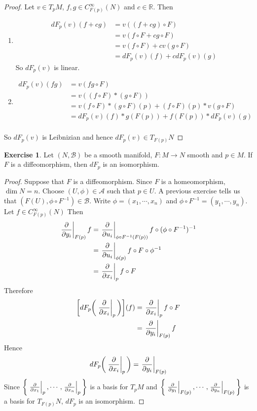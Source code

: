 \documentclass[12pt]{amsart}
\theoremstyle{definition}
\theoremstyle{definition}
\newtheorem{ex}[definition]{Exercise}
\newcommand{\R}{\mathbb{R}}
\newcommand{\MA}{\mathcal{A}}
\newcommand{\MB}{\mathcal{B}}
\begin{document}
	\begin{proof}
	Let $v \in T_pM$, $f,g \in C_{F(p)}^{\infty}(N)$ and $c \in \R$. Then 
	\begin{enumerate}
	\item 
	\begin{align*}
		dF_p(v)(f+cg) 
		&= v((f+cg) \circ F) \\
		&= v(f \circ F + c g \circ F) \\
		&= v(f \circ F) + cv(g \circ F) \\
		&= dF_p(v)(f) + c dF_p(v)(g)
	\end{align*}
	So $dF_p(v)$ is linear.
	\item 
	\begin{align*}
	dF_p(v)(fg) 
	&= v (fg \circ F) \\
	&= v((f \circ F)* (g \circ F)) \\
	&= v(f \circ F)*(g \circ F)(p) +  (f \circ F)(p)* v(g \circ F) \\
	&= dF_p(v)(f) * g(F(p)) + f(F(p))*dF_p(v)(g) \\
	\end{align*}
	\end{enumerate}
	So $dF_p(v)$ is Leibnizian and hence $dF_p(v) \in T_{F(p)}N$
	\end{proof}

	\begin{ex}
		Let $(N, \MB)$ be a smooth manifold, $F: M \rightarrow N$ smooth and $p \in M$. If $F$ is a diffeomorphism, then $dF_p$ is an isomorphism.
	\end{ex}
	
	\begin{proof}
		Suppose that $F$ is a diffeomorphism. Since $F$ is a homeomorphism, $\dim N = n$. Choose $(U, \phi) \in \MA$ such that $p \in U$. A previous exercise tells us that $(F(U), \phi \circ F^{-1}) \in \MB$. Write $\phi = (x_1, \cdots, x_n)$ and $\phi \circ F^{-1} = (y_1, \cdots, y_n)$. Let $f \in C^{\infty}_{F(p)}(N)$ Then 
		\begin{align*}
			\eval{\pdv{y_i}}_{F(p)} f
			&= 	\eval{\pdv{u_i}}_{\phi \circ F^{-1} (F(p))} f \circ (\phi \circ F^{-1})^{-1} \\
			&= 	\eval{\pdv{u_i}}_{\phi(p)} f \circ F \circ \phi^{-1} \\
			&= 	\eval{\pdv{x_i}}_p f \circ F \\
		\end{align*}
		Therefore 
		\begin{align*}
			\bigg[ dF_p \bigg( \eval{\pdv{x_i}}_p \bigg) \bigg] (f)
			&= \eval{\pdv{x_i}}_p f \circ F \\
			&= \eval{\pdv{y_i}}_{F(p)} f 
		\end{align*}
	Hence $$dF_p \bigg( \eval{\pdv{x_i}}_p \bigg) = \eval{\pdv{y_i}}_{F(p)}$$ 
	Since $\bigg \{\eval{\pdv{x_1}}_{p}, \cdots, \eval{\pdv{x_n}}_{p} \bigg \}$ is a basis for $T_pM$ and $\bigg \{\eval{\pdv{y_1}}_{F(p)}, \cdots, \eval{\pdv{y_n}}_{F(p)} \bigg \}$ is a basis for $T_{F(p)}N$, $dF_p$ is an isomorphism.
	\end{proof}
\end{document}
